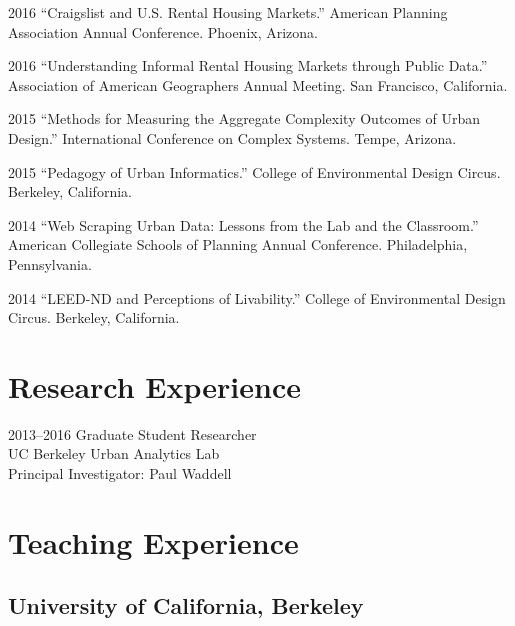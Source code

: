 \documentclass{academiccv}
\begin{document}
\begin{tablist}

\item[2016] \tab \enquote{Craigslist and U.S. Rental Housing Markets.} American Planning Association Annual Conference. Phoenix, Arizona.

\item[2016] \tab \enquote{Understanding Informal Rental Housing Markets through Public Data.} Association of American Geographers Annual Meeting. San Francisco, California.

\item[2015] \tab \enquote{Methods for Measuring the Aggregate Complexity Outcomes of Urban Design.} International Conference on Complex Systems. Tempe, Arizona.

\item[2015] \tab \enquote{Pedagogy of Urban Informatics.} College of Environmental Design Circus. Berkeley, California.

\item[2014] \tab \enquote{Web Scraping Urban Data: Lessons from the Lab and the Classroom.} American Collegiate Schools of Planning Annual Conference. Philadelphia, Pennsylvania.

\item[2014] \tab \enquote{LEED-ND and Perceptions of Livability.} College of Environmental Design Circus. Berkeley, California.

\end{tablist}



\section*{Research Experience}

\begin{tablist}
\item[2013--2016] \tab Graduate Student Researcher \\
                       UC Berkeley Urban Analytics Lab \\
                       Principal Investigator: Paul Waddell
\end{tablist}



\section*{Teaching Experience}

\subsection*{University of California, Berkeley}
\end{document}

